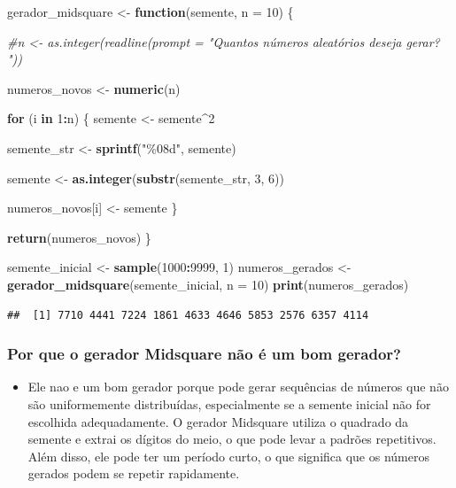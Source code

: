 \documentclass[
]{article}
\newenvironment{Shaded}{\begin{snugshade}}{\end{snugshade}}
\newcommand{\AttributeTok}[1]{\textcolor[rgb]{0.13,0.29,0.53}{#1}}
\newcommand{\CommentTok}[1]{\textcolor[rgb]{0.56,0.35,0.01}{\textit{#1}}}
\newcommand{\ControlFlowTok}[1]{\textcolor[rgb]{0.13,0.29,0.53}{\textbf{#1}}}
\newcommand{\DecValTok}[1]{\textcolor[rgb]{0.00,0.00,0.81}{#1}}
\newcommand{\FunctionTok}[1]{\textcolor[rgb]{0.13,0.29,0.53}{\textbf{#1}}}
\newcommand{\NormalTok}[1]{#1}
\newcommand{\OtherTok}[1]{\textcolor[rgb]{0.56,0.35,0.01}{#1}}
\newcommand{\SpecialCharTok}[1]{\textcolor[rgb]{0.81,0.36,0.00}{\textbf{#1}}}
\newcommand{\StringTok}[1]{\textcolor[rgb]{0.31,0.60,0.02}{#1}}
\providecommand{\tightlist}{%
  \setlength{\itemsep}{0pt}\setlength{\parskip}{0pt}}
\begin{document}
\begin{Shaded}
\begin{Highlighting}[]
\NormalTok{gerador\_midsquare }\OtherTok{\textless{}{-}} \ControlFlowTok{function}\NormalTok{(semente, }\AttributeTok{n =} \DecValTok{10}\NormalTok{) \{}

  \CommentTok{\#n \textless{}{-} as.integer(readline(prompt = "Quantos números aleatórios deseja gerar? "))}

\NormalTok{  numeros\_novos }\OtherTok{\textless{}{-}} \FunctionTok{numeric}\NormalTok{(n)}

  \ControlFlowTok{for}\NormalTok{ (i }\ControlFlowTok{in} \DecValTok{1}\SpecialCharTok{:}\NormalTok{n) \{}
\NormalTok{    semente }\OtherTok{\textless{}{-}}\NormalTok{ semente}\SpecialCharTok{\^{}}\DecValTok{2}

\NormalTok{    semente\_str }\OtherTok{\textless{}{-}} \FunctionTok{sprintf}\NormalTok{(}\StringTok{"\%08d"}\NormalTok{, semente)}

\NormalTok{    semente }\OtherTok{\textless{}{-}} \FunctionTok{as.integer}\NormalTok{(}\FunctionTok{substr}\NormalTok{(semente\_str, }\DecValTok{3}\NormalTok{, }\DecValTok{6}\NormalTok{))}

\NormalTok{    numeros\_novos[i] }\OtherTok{\textless{}{-}}\NormalTok{ semente}
\NormalTok{  \}}

  \FunctionTok{return}\NormalTok{(numeros\_novos)}
\NormalTok{\}}



\NormalTok{semente\_inicial }\OtherTok{\textless{}{-}} \FunctionTok{sample}\NormalTok{(}\DecValTok{1000}\SpecialCharTok{:}\DecValTok{9999}\NormalTok{, }\DecValTok{1}\NormalTok{)}
\NormalTok{numeros\_gerados }\OtherTok{\textless{}{-}} \FunctionTok{gerador\_midsquare}\NormalTok{(semente\_inicial, }\AttributeTok{n =} \DecValTok{10}\NormalTok{)}
\FunctionTok{print}\NormalTok{(numeros\_gerados)}
\end{Highlighting}
\end{Shaded}

\begin{verbatim}
##  [1] 7710 4441 7224 1861 4633 4646 5853 2576 6357 4114
\end{verbatim}

\subsubsection{Por que o gerador Midsquare não é um bom
gerador?}\label{por-que-o-gerador-midsquare-nuxe3o-uxe9-um-bom-gerador}

\begin{itemize}
\tightlist
\item
  Ele nao e um bom gerador porque pode gerar sequências de números que
  não são uniformemente distribuídas, especialmente se a semente inicial
  não for escolhida adequadamente. O gerador Midsquare utiliza o
  quadrado da semente e extrai os dígitos do meio, o que pode levar a
  padrões repetitivos. Além disso, ele pode ter um período curto, o que
  significa que os números gerados podem se repetir rapidamente.
\end{itemize}
\end{document}
